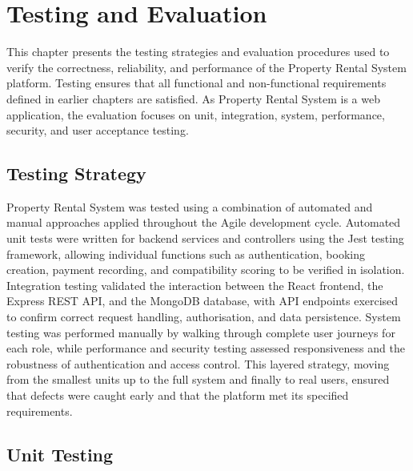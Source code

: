 
\chapter{Testing and Evaluation}

This chapter presents the testing strategies and evaluation procedures used to verify the correctness, reliability, and performance of the Property Rental System platform. Testing ensures that all functional and non-functional requirements defined in earlier chapters are satisfied. As Property Rental System is a web application, the evaluation focuses on unit, integration, system, performance, security, and user acceptance testing.


\section{Testing Strategy}

Property Rental System was tested using a combination of automated and manual approaches applied throughout the Agile development cycle. Automated unit tests were written for backend services and controllers using the Jest testing framework, allowing individual functions such as authentication, booking creation, payment recording, and compatibility scoring to be verified in isolation. Integration testing validated the interaction between the React frontend, the Express REST API, and the MongoDB database, with API endpoints exercised to confirm correct request handling, authorisation, and data persistence. System testing was performed manually by walking through complete user journeys for each role, while performance and security testing assessed responsiveness and the robustness of authentication and access control. This layered strategy, moving from the smallest units up to the full system and finally to real users, ensured that defects were caught early and that the platform met its specified requirements.


\section{Unit Testing}

